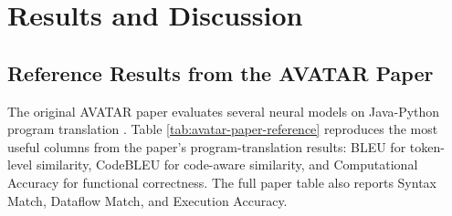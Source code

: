 \chapter{Results and Discussion}

\section{Reference Results from the AVATAR Paper}

\quad The original AVATAR paper evaluates several neural models on Java-Python
program translation \cite{ahmad2023avatar}. Table
\ref{tab:avatar-paper-reference} reproduces the most useful columns from the
paper's program-translation results: BLEU for token-level similarity, CodeBLEU
for code-aware similarity, and Computational Accuracy for functional
correctness. The full paper table also reports Syntax Match, Dataflow Match,
and Execution Accuracy.

\begin{table}[htbp]
\centering
\caption{Reference results reported in the original AVATAR paper.}
\label{tab:avatar-paper-reference}
\end{table}

